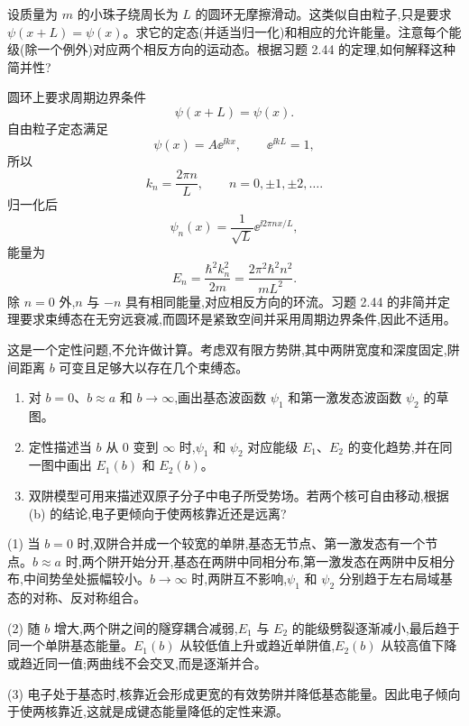 \begin{question}
设质量为 $m$ 的小珠子绕周长为 $L$ 的圆环无摩擦滑动。这类似自由粒子,只是要求 $\psi(x+L)=\psi(x)$。求它的定态(并适当归一化)和相应的允许能量。注意每个能级(除一个例外)对应两个相反方向的运动态。根据习题 2.44 的定理,如何解释这种简并性?
\begin{solution}
圆环上要求周期边界条件
\[
\psi(x+L)=\psi(x).
\]
自由粒子定态满足
\[
\psi(x)=A\ee^{\ii kx},
\qquad \ee^{\ii kL}=1,
\]
所以
\[
k_n=\frac{2\pi n}{L},
\qquad n=0,\pm1,\pm2,\ldots.
\]
归一化后
\[
\psi_n(x)=\frac1{\sqrt L}\ee^{\ii2\pi nx/L},
\]
能量为
\[
E_n=\frac{\hbar^2k_n^2}{2m}
=\frac{2\pi^2\hbar^2n^2}{mL^2}.
\]
除 $n=0$ 外,$n$ 与 $-n$ 具有相同能量,对应相反方向的环流。习题 2.44 的非简并定理要求束缚态在无穷远衰减,而圆环是紧致空间并采用周期边界条件,因此不适用。
\end{solution}
\end{question}

\begin{question}
这是一个定性问题,不允许做计算。考虑双有限方势阱,其中两阱宽度和深度固定,阱间距离 $b$ 可变且足够大以存在几个束缚态。
\begin{enumerate}
\item 对 $b=0$、$b\approx a$ 和 $b\to\infty$,画出基态波函数 $\psi_1$ 和第一激发态波函数 $\psi_2$ 的草图。
\item 定性描述当 $b$ 从 $0$ 变到 $\infty$ 时,$\psi_1$ 和 $\psi_2$ 对应能级 $E_1$、$E_2$ 的变化趋势,并在同一图中画出 $E_1(b)$ 和 $E_2(b)$。
\item 双阱模型可用来描述双原子分子中电子所受势场。若两个核可自由移动,根据 (b) 的结论,电子更倾向于使两核靠近还是远离?
\end{enumerate}
\begin{solution}
(1) 当 $b=0$ 时,双阱合并成一个较宽的单阱,基态无节点、第一激发态有一个节点。$b\approx a$ 时,两个阱开始分开,基态在两阱中同相分布,第一激发态在两阱中反相分布,中间势垒处振幅较小。$b\to\infty$ 时,两阱互不影响,$\psi_1$ 和 $\psi_2$ 分别趋于左右局域基态的对称、反对称组合。

(2) 随 $b$ 增大,两个阱之间的隧穿耦合减弱,$E_1$ 与 $E_2$ 的能级劈裂逐渐减小,最后趋于同一个单阱基态能量。$E_1(b)$ 从较低值上升或趋近单阱值,$E_2(b)$ 从较高值下降或趋近同一值;两曲线不会交叉,而是逐渐并合。

(3) 电子处于基态时,核靠近会形成更宽的有效势阱并降低基态能量。因此电子倾向于使两核靠近,这就是成键态能量降低的定性来源。
\end{solution}
\end{question}

